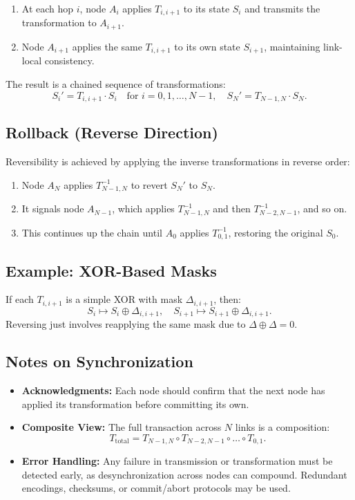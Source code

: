 \documentclass[../../../OAE-SPEC-MAIN.tex]{subfiles}
\begin{document}
\begin{enumerate}
\item At each hop \(i\), node \(A_i\) applies \(T_{i,i+1}\) to its state \(S_i\) and transmits the transformation to \(A_{i+1}\).
\item Node \(A_{i+1}\) applies the same \(T_{i,i+1}\) to its own state \(S_{i+1}\), maintaining link-local consistency.
\end{enumerate}

The result is a chained sequence of transformations:
\[
  S_i' = T_{i,i+1} \cdot S_i \quad \text{for } i = 0, 1, \dots, N-1,
\quad
S_N' = T_{N-1,N} \cdot S_N.
\]

\subsection{Rollback (Reverse Direction)}

Reversibility is achieved by applying the inverse transformations in reverse order:

\begin{enumerate}
\item Node \(A_N\) applies \(T_{N-1,N}^{-1}\) to revert \(S_N'\) to \(S_N\).
\item It signals node \(A_{N-1}\), which applies \(T_{N-1,N}^{-1}\) and then \(T_{N-2,N-1}^{-1}\), and so on.
\item This continues up the chain until \(A_0\) applies \(T_{0,1}^{-1}\), restoring the original \(S_0\).
\end{enumerate}

\subsection{Example: XOR-Based Masks}

If each \(T_{i,i+1}\) is a simple XOR with mask \(\Delta_{i,i+1}\), then:
\[
  S_i \mapsto S_i \oplus \Delta_{i,i+1}, \quad
  S_{i+1} \mapsto S_{i+1} \oplus \Delta_{i,i+1}.
\]
Reversing just involves reapplying the same mask due to \(\Delta \oplus \Delta = 0\).

\subsection{Notes on Synchronization}

\begin{itemize}
\item \textbf{Acknowledgments:} Each node should confirm that the next node has applied its transformation before committing its own.
\item \textbf{Composite View:} The full transaction across \(N\) links is a composition:
\[
  T_{\text{total}} = T_{N-1,N} \circ T_{N-2,N-1} \circ \dots \circ T_{0,1}.
\]
\item \textbf{Error Handling:} Any failure in transmission or transformation must be detected early, as desynchronization across nodes can compound. Redundant encodings, checksums, or commit/abort protocols may be used.
\end{itemize}
\end{document}
